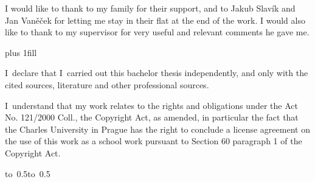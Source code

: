 \documentclass[12pt,a4paper,fleqn]{report}
\let\openright=\clearpage
\begin{document}
\newpage

I would like to thank to my family for their support, and to Jakub Slavík and
Jan Vaněček for letting me stay in their flat at the end of the work. I would
also like to thank to my supervisor for very useful and relevant comments he
gave me.


\openright

\noindent



\vglue 0pt plus 1fill

\noindent
I~declare that I~carried out this bachelor thesis independently, and only with
the cited sources, literature and other professional sources.

\medskip\noindent
I~understand that my work relates to the rights and obligations under the Act
No. 121/2000 Coll., the Copyright Act, as amended, in particular the fact that
the Charles University in Prague has the right to conclude a license agreement
on the use of this work as a school work pursuant to Section 60 paragraph 1 of
the Copyright Act.

\vspace{10mm}

\hbox{\hbox to 0.5\hbox to 0.5}

\vspace{20mm}
\newpage

\end{document}
